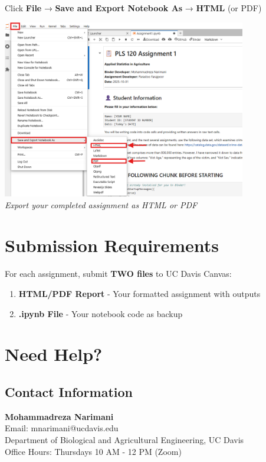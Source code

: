 \documentclass[11pt,a4paper]{article}
\begin{document}
Click \textbf{File} → \textbf{Save and Export Notebook As} → \textbf{HTML} (or PDF)

\begin{center}
\includegraphics[width=0.8\textwidth]{../Image_10.png}\\
\textit{Export your completed assignment as HTML or PDF}
\end{center}

\section{Submission Requirements}

For each assignment, submit \textbf{TWO files} to UC Davis Canvas:

\begin{enumerate}
    \item \textbf{HTML/PDF Report} - Your formatted assignment with outputs
    \item \textbf{.ipynb File} - Your notebook code as backup
\end{enumerate}

\section{Need Help?}

\subsection{Contact Information}

\begin{infobox}
\textbf{Mohammadreza Narimani}\\
Email: mnarimani@ucdavis.edu\\
Department of Biological and Agricultural Engineering, UC Davis\\
Office Hours: Thursdays 10 AM - 12 PM (Zoom)
\end{infobox}
\end{document}
